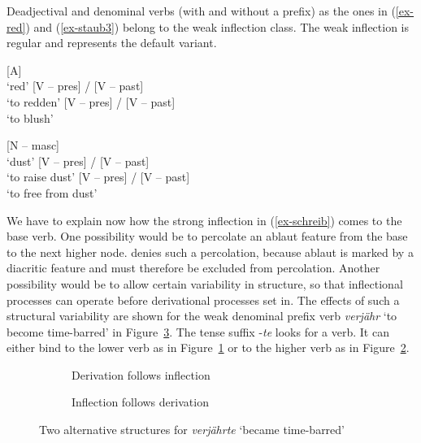 \documentclass[output=paper
  ,nobabel
  ,draftmode
  ,colorlinks, citecolor=brown
]{langscibook}
\begin{document}
\noindent Deadjectival and denominal verbs (with and without a prefix) as the ones in (\ref{ex-red}) and (\ref{ex-staub3}) belong to the weak inflection class. The weak inflection is regular and represents the default variant.

\eal\label{ex-red}
\ex{} {}[A{}]\\`red'
\ex{} {}[V – pres{}] /  {}[V – past{}]\\ `to redden'
\ex{} {}[V – pres{}] /  {}[V – past{}]\\`to blush'
\zl

\eal\label{ex-staub3}
\ex{} {}[N – masc{}]\\`dust'
\ex{} {}[V – pres{}] /  {}[V – past{}]\\`to raise dust'
\ex{} {}[V – pres{}] /  {}[V – past{}]\\`to free from dust'
\zl

\largerpage
\noindent 
We have to explain now how the strong inflection in (\ref{ex-schreib}) comes to the base verb. One possibility would be to percolate an ablaut feature from the base to the next higher node. \citet{Lieber1992} denies such a percolation, because ablaut is marked by a diacritic feature and must therefore be excluded from percolation. Another possibility would be to allow certain variability in structure, so that inflectional processes can operate before derivational processes set in. The effects of such a structural variability are shown for the weak denominal prefix verb \emph{verjähr} `to become time-barred' in Figure~\ref{ex-verjahr}. The tense suffix -\emph{te} looks for a verb. It can either bind to the lower verb as in Figure~\ref{ex-verjährte} or to the higher verb as in Figure~\ref{ex-verjährte-b}.

\begin{figure}
\begin{subfigure}{.48\textwidth}
\centering
{}
\caption{Derivation follows inflection}\label{ex-verjährte}
\end{subfigure}
\begin{subfigure}{.48\textwidth}
\centering
{}
\caption{Inflection follows derivation}\label{ex-verjährte-b}
\end{subfigure}
\caption{Two alternative structures for \emph{verjährte} `became time-barred'}\label{ex-verjahr}
\end{figure}
\end{document}
